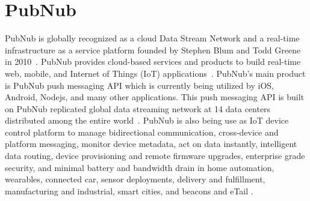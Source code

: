 \section{PubNub}

PubNub is globally recognized as a cloud Data Stream Network and a
real-time infrastructure as a service platform founded by Stephen Blum
and Todd Greene in 2010~\cite{ hid-sp18-409-www-pubnub}. PubNub
provides cloud-based services and products to build real-time web,
mobile, and Internet of Things (IoT) applications~\cite{
  hid-sp18-409-www-pubnub-wikipedia}. PubNub's main product is PubNub
push messaging API which is currently being utilized by iOS, Android,
Nodejs, and many other applications.  This push messaging API is built
on PubNub replicated global data streaming network at 14 data centers
distributed among the entire
world~\cite{hid-sp18-409-www-pubnub-wikipedia}.  PubNub is also being
use as IoT device control platform to manage bidirectional
communication, cross-device and platform messaging, monitor device
metadata, act on data instantly, intelligent data routing, device
provisioning and remote firmware upgrades, enterprise grade security,
and minimal battery and bandwidth drain in home automation, wearables,
connected car, sensor deployments, delivery and fulfillment,
manufacturing and industrial, smart cities, and beacons and eTail
\cite{hid-sp18-409-www-pubnub}.
